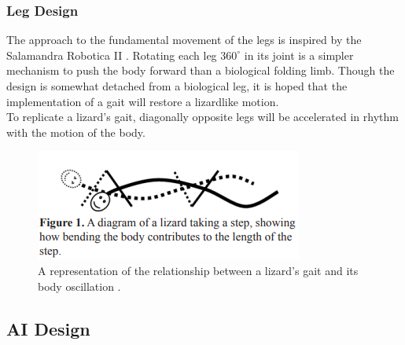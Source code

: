 \documentclass{article}
\begin{document}
\subsubsection{Leg Design}
\label{sec:Leg Movement}
The approach to the fundamental movement of the legs is inspired by the Salamandra Robotica II . Rotating each leg $360^\circ$ in its joint is a simpler mechanism to push the body forward than a biological folding limb. Though the design is somewhat detached from a biological leg, it is hoped that the implementation of a gait will restore a lizardlike motion.\\
To replicate a lizard's gait, diagonally opposite legs will be accelerated in rhythm with the motion of the body. 
\begin{figure}[H]
\centering
\includegraphics[scale=1]{lizardGait}
\caption{A representation of the relationship between a lizard's gait and its body oscillation \citep{reptileLocomotion}.}
\end{figure}

\newpage
\subsection{AI Design}
\end{document}
